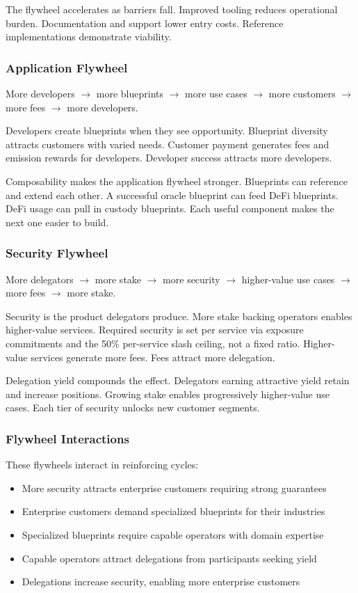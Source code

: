 \documentclass[11pt,a4paper]{article}
\begin{document}
The flywheel accelerates as barriers fall. Improved tooling reduces operational burden. Documentation and support lower entry costs. Reference implementations demonstrate viability.

\subsubsection{Application Flywheel}

More developers $\rightarrow$ more blueprints $\rightarrow$ more use cases $\rightarrow$ more customers $\rightarrow$ more fees $\rightarrow$ more developers.

Developers create blueprints when they see opportunity. Blueprint diversity attracts customers with varied needs. Customer payment generates fees and emission rewards for developers. Developer success attracts more developers.

Composability makes the application flywheel stronger. Blueprints can reference and extend each other. A successful oracle blueprint can feed DeFi blueprints. DeFi usage can pull in custody blueprints. Each useful component makes the next one easier to build.

\subsubsection{Security Flywheel}

More delegators $\rightarrow$ more stake $\rightarrow$ more security $\rightarrow$ higher-value use cases $\rightarrow$ more fees $\rightarrow$ more stake.

Security is the product delegators produce. More stake backing operators enables higher-value services. Required security is set per service via exposure commitments and the 50\% per-service slash ceiling, not a fixed ratio. Higher-value services generate more fees. Fees attract more delegation.

Delegation yield compounds the effect. Delegators earning attractive yield retain and increase positions. Growing stake enables progressively higher-value use cases. Each tier of security unlocks new customer segments.

\subsubsection{Flywheel Interactions}

These flywheels interact in reinforcing cycles:

\begin{itemize}[noitemsep]
    \item More security attracts enterprise customers requiring strong guarantees
    \item Enterprise customers demand specialized blueprints for their industries
    \item Specialized blueprints require capable operators with domain expertise
    \item Capable operators attract delegations from participants seeking yield
    \item Delegations increase security, enabling more enterprise customers
\end{itemize}
\end{document}
